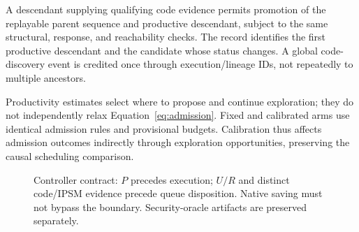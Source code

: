 \documentclass[final,5p,times,number]{elsarticle}
\newcommand{\gcode}{G_{\mathrm{code}}}
\newcommand{\gstate}{G_{\mathrm{state}}}
\begin{document}
A descendant supplying qualifying code evidence permits promotion of the replayable parent sequence and productive descendant, subject to the same structural, response, and reachability checks. The record identifies the first productive descendant and the candidate whose status changes. A global code-discovery event is credited once through execution/lineage IDs, not repeatedly to multiple ancestors.

Productivity estimates select where to propose and continue exploration; they do not independently relax Equation~\ref{eq:admission}. Fixed and calibrated arms use identical admission rules and provisional budgets. Calibration thus affects admission outcomes indirectly through exploration opportunities, preserving the causal scheduling comparison.

\begin{figure}[t]
\centering
{}
\caption{Controller contract: $P$ precedes execution; $U/R$ and distinct code/IPSM evidence precede queue disposition. Native saving must not bypass the boundary. Security-oracle artifacts are preserved separately.}
\label{fig:architecture}
\end{figure}
\end{document}

